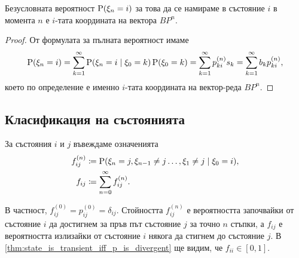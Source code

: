 \documentclass{../../common/topic}
\begin{document}
\begin{corollary}
  Безусловната вероятност \( \operatorname{P}(\xi_n = i) \) за това да се намираме в състояние \( i \) в момента \( n \) е \( i \)-тата координата на вектора \( B P^n \).
\end{corollary}
\begin{proof}
  От формулата за пълната вероятност имаме
  \begin{equation*}
    \operatorname{P}(\xi_n = i)
    =
    \sum_{k=1}^\infty \operatorname{P}(\xi_n = i \mid \xi_0 = k) \operatorname{P}(\xi_0 = k)
    =
    \sum_{k=1}^\infty p^{(n)}_{ki} s_k
    =
    \sum_{k=1}^\infty b_k p^{(n)}_{ki},
  \end{equation*}
  което по определение е именно \( i \)-тата координата на вектор-реда \( B P^n \).
\end{proof}

\subsection{Класификация на състоянията}

За състояния \( i \) и \( j \) въвеждаме означенията
\begin{align*}
  f_{ij}^{(n)} &\coloneqq \operatorname{P}(\xi_n = j, \xi_{n-1} \neq j \ldots, \xi_1 \neq j \mid \xi_0 = i), \\
  f_{ij} &\coloneqq \sum_{n=0}^\infty f_{ij}^{(n)}.
\end{align*}

В частност, \( f_{ij}^{(0)} = p_{ij}^{(0)} = \delta_{ij} \). Стойността \( f^{(n)}_{ij} \) е вероятността започвайки от състояние \( i \) да достигнем за пръв път състояние \( j \) за точно \( n \) стъпки, а \( f_{ij} \) е вероятността излизайки от състояние \( i \) някога да стигнем до състояние \( j \).  В \cref{thm:state_is_transient_iff_p_is_divergent} ще видим, че \( f_{ii} \in [0, 1] \).
\end{document}
